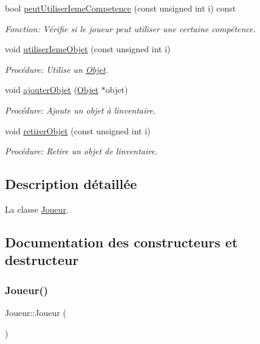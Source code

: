 \begin{DoxyCompactItemize}
bool \mbox{\hyperlink{classJoueur_a7e9c44aa28a9b9578af732651f76c82d}{peut\+Utiliser\+Ieme\+Competence}} (const unsigned int i) const
\begin{DoxyCompactList}\small\item\em Fonction\+: Vérifie si le joueur peut utiliser une certaine compétence. \end{DoxyCompactList}\item 
void \mbox{\hyperlink{classJoueur_afadc41460cd333b617d0b1643e4c0feb}{utiliser\+Ieme\+Objet}} (const unsigned int i)
\begin{DoxyCompactList}\small\item\em Procédure\+: Utilise un \mbox{\hyperlink{structObjet}{Objet}}. \end{DoxyCompactList}\item 
void \mbox{\hyperlink{classJoueur_a948d55ce2e039906efc45b95c3f700c2}{ajouter\+Objet}} (\mbox{\hyperlink{structObjet}{Objet}} $\ast$objet)
\begin{DoxyCompactList}\small\item\em Procédure\+: Ajoute un objet à l\textquotesingle{}inventaire. \end{DoxyCompactList}\item 
void \mbox{\hyperlink{classJoueur_a3bc7264efba044ad356416dcfea263ed}{retirer\+Objet}} (const unsigned int i)
\begin{DoxyCompactList}\small\item\em Procédure\+: Retire un objet de l\textquotesingle{}inventaire. \end{DoxyCompactList}\end{DoxyCompactItemize}


\subsection{Description détaillée}
La classe \mbox{\hyperlink{classJoueur}{Joueur}}. 

\subsection{Documentation des constructeurs et destructeur}
\mbox{\label{classJoueur_add6c98be3020651d84f6d75ccc1d867e}} 
\subsubsection{\texorpdfstring{Joueur()}{Joueur()}\hspace{0.1cm}{\footnotesize\ttfamily [1/3]}}
{\footnotesize\ttfamily Joueur\+::\+Joueur (\begin{DoxyParamCaption}{ }\end{DoxyParamCaption})}



